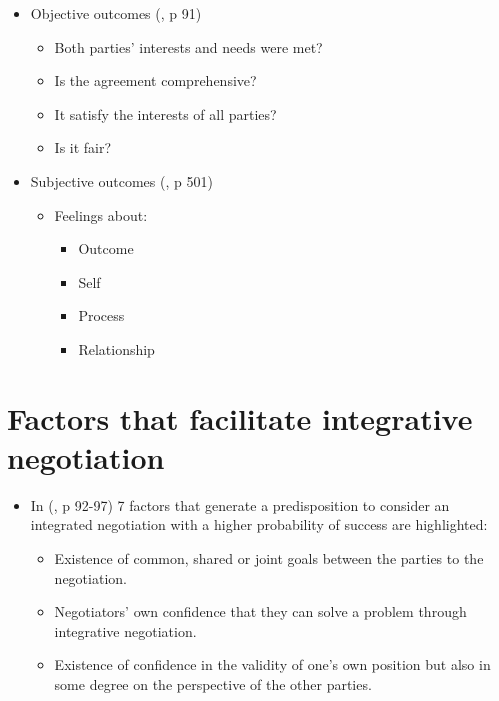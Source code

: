 \documentclass[
  ignorenonframetext,
]{beamer}
\providecommand{\tightlist}{%
  \setlength{\itemsep}{0pt}\setlength{\parskip}{0pt}}\usepackage{longtable,booktabs,array}
\begin{document}
\begin{frame}{}
\label{section-14}
\begin{itemize}
\item
  Objective outcomes (, p 91)

  \begin{itemize}
  \tightlist
  \item
    Both parties' interests and needs were met?
  \item
    Is the agreement comprehensive?
  \item
    It satisfy the interests of all parties?
  \item
    Is it fair?
  \end{itemize}
\item
  Subjective outcomes (, p 501)

  \begin{itemize}
  \item
    Feelings about:

    \begin{itemize}
    \tightlist
    \item
      Outcome
    \item
      Self
    \item
      Process
    \item
      Relationship
    \end{itemize}
  \end{itemize}
\end{itemize}
\end{frame}

\section{Factors that facilitate integrative
negotiation}\label{factors-that-facilitate-integrative-negotiation}

\begin{frame}{}
\label{section-15}
\begin{itemize}
\item
  In (, p 92-97) 7 factors that generate a predisposition to
  consider an integrated negotiation with a higher probability of
  success are highlighted:

  \begin{itemize}
  \tightlist
  \item
    Existence of common, shared or joint goals between the parties to
    the negotiation.
  \item
    Negotiators' own confidence that they can solve a problem through
    integrative negotiation.
  \item
    Existence of confidence in the validity of one's own position but
    also in some degree on the perspective of the other parties.
  \end{itemize}
\end{itemize}
\end{frame}
\end{document}
